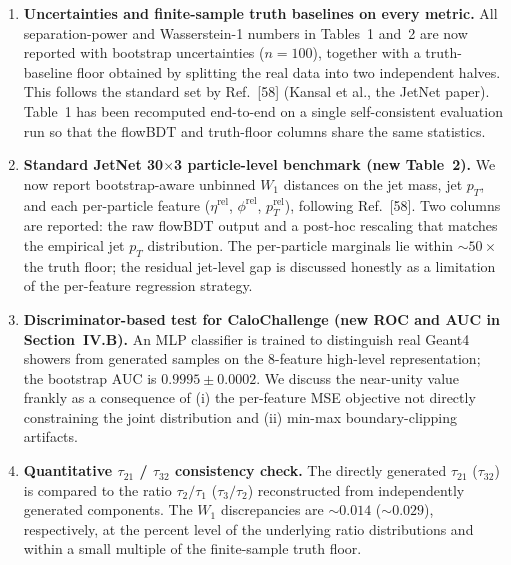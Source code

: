 \documentclass[11pt]{article}
\begin{document}
\begin{enumerate}

  \item \textbf{Uncertainties and finite-sample truth baselines on every
        metric.}  All separation-power and Wasserstein-1 numbers in
        Tables~1 and~2 are now reported with bootstrap uncertainties
        ($n=100$), together with a truth-baseline floor obtained by
        splitting the real data into two independent halves.  This
        follows the standard set by Ref.~[58] (Kansal et al., the JetNet
        paper).  Table~1 has been recomputed end-to-end on a single
        self-consistent evaluation run so that the flowBDT and
        truth-floor columns share the same statistics.

  \item \textbf{Standard JetNet 30$\times$3 particle-level benchmark
        (new Table~2).}  We now report bootstrap-aware unbinned $W_1$
        distances on the jet mass, jet $p_T$, and each per-particle
        feature ($\eta^\mathrm{rel}$, $\phi^\mathrm{rel}$,
        $p_T^\mathrm{rel}$), following Ref.~[58].  Two columns are
        reported: the raw flowBDT output and a post-hoc rescaling that
        matches the empirical jet $p_T$ distribution.  The per-particle
        marginals lie within $\sim\!50\times$ the truth floor; the
        residual jet-level gap is discussed honestly as a limitation of
        the per-feature regression strategy.

  \item \textbf{Discriminator-based test for CaloChallenge (new ROC and
        AUC in Section~IV.B).}  An MLP classifier is trained to
        distinguish real Geant4 showers from generated samples on the
        8-feature high-level representation; the bootstrap AUC is
        $0.9995 \pm 0.0002$.  We discuss the near-unity value frankly as
        a consequence of (i) the per-feature MSE objective not directly
        constraining the joint distribution and (ii) min-max
        boundary-clipping artifacts.

  \item \textbf{Quantitative $\tau_{21}$ / $\tau_{32}$ consistency
        check.}  The directly generated $\tau_{21}$ ($\tau_{32}$) is
        compared to the ratio $\tau_2/\tau_1$ ($\tau_3/\tau_2$)
        reconstructed from independently generated components.  The
        $W_1$ discrepancies are $\sim\!0.014$ ($\sim\!0.029$),
        respectively, at the percent level of the underlying ratio
        distributions and within a small multiple of the finite-sample
        truth floor.


\end{enumerate}
\end{document}
